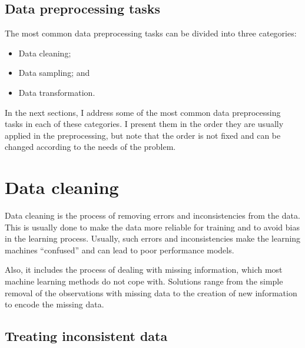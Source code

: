 \subsection{Data preprocessing tasks}

The most common data preprocessing tasks can be divided into three categories:
\begin{itemize}
  \itemsep0em
  \item Data cleaning;
  \item Data sampling; and
  \item Data transformation.
\end{itemize}

In the next sections, I address some of the most common data preprocessing tasks
in each of these categories.  I present them in the order they are usually applied in the
preprocessing, but note that the order is not fixed and can be changed according to the
needs of the problem.

\section{Data cleaning}

Data cleaning is the process of removing errors and inconsistencies from the data.  This is
usually done to make the data more reliable for training and to avoid bias in the learning
process.  Usually, such errors and inconsistencies make the learning machines ``confused''
and can lead to poor performance models.

Also, it includes the process of dealing with missing information, which most machine
learning methods do not cope with.  Solutions range from the simple removal of the
observations with missing data to the creation of new information to encode the missing data.

\subsection{Treating inconsistent data}


